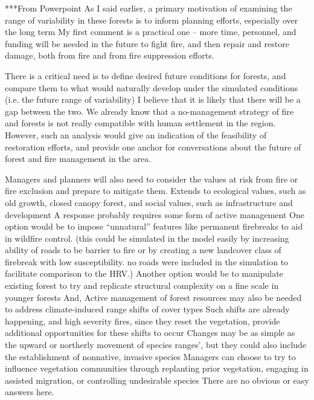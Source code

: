 ***From Powerpoint
As I said earlier, a primary motivation of examining the range of variability in these forests is to inform planning efforts, especially over the long term
My first comment is a practical one – more time, personnel, and funding will be needed in the future to fight fire, and then repair and restore damage, both from fire and from fire suppression efforts.

There is a critical need is to define desired future conditions for forests, and compare them to what would naturally develop under the simulated conditions (i.e. the future range of variability)
I believe that it is likely that there will be a gap between the two. We already know that a no-management strategy of fire and forests is not really compatible with human settlement in the region.
However, such an analysis would give an indication of the feasibility of restoration efforts, and provide one anchor for conversations about the future of forest and fire management in the area.

Managers and planners will also need to consider the values at risk from fire or fire exclusion and prepare to mitigate them.
Extends to ecological values, such as old growth, closed canopy forest, and social values, such as infrastructure and development
A response probably requires some form of active management
One option would be to impose “unnatural” features like permanent firebreaks to aid in wildfire control. (this could be simulated in the model easily by increasing ability of roads to be barrier to fire or by creating a new landcover class of firebreak with low susceptibility. no roads were included in the simulation to facilitate comparison to the HRV.)
Another option would be to manipulate existing forest to try and replicate structural complexity on a fine scale in younger forests
And, Active management of forest resources may also be needed to address climate-induced range shifts of cover types
Such shifts are already happening, and high severity fires, since they reset the vegetation, provide additional opportunities for these shifts to occur
Changes may be as simple as the upward or northerly movement of species ranges’, but they could also include the establishment of nonnative, invasive species
Managers can choose to try to influence vegetation communities through replanting prior vegetation, engaging in assisted migration, or controlling undesirable species
There are no obvious or easy answers here.


